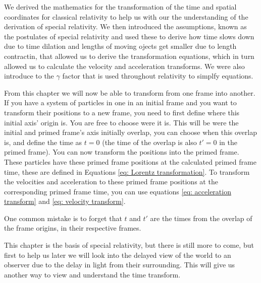 We derived the mathematics for the transformation of the time and spatial coordinates for classical relativity to help us with our the understanding of the derivation of special relativity.
We then introduced the assumptions, known as the postulates of special relativity and used these to derive how time slows down due to time dilation and lengths of moving ojects get smaller due to length contractin, that allowed us to derive the transformation equations, which in turn allowed us to calculate the velocity and acceleration transforms.
We were also introduce to the $\gamma$ factor that is used throughout relativity to simplfy equations.

From this chapter we will now be able to transform from one frame into another.
If you have a system of particles in one in an initial frame and you want to transform their positions to a new frame, you need to first define where this initial axis' origin is.
You are free to choose were it is.
This will be were the initial and primed frame's axis initially overlap, you can choose when this overlap is, and define the time as ${t}=0$ (the time of the overlap is also ${t{'}}=0$ in the primed frame).
You can now transform the positions into the primed frame.
These particles have these primed frame positions at the calculated primed frame time, these are defined in Equations \eqref{eq: Lorentz transformation}.
To transform the velocities and acceleration to these primed frame positions at the corresponding primed frame time, you can use equations \eqref{eq: acceleration transform} and \eqref{eq: velocity transform}.

One common mistake is to forget that ${t}$ and ${t{'}}$ are the times from the overlap of the frame origins, in their respective frames.

This chapter is the basis of special relativity, but there is still more to come, but first to help us later we will look into the delayed view of the world to an observer due to the delay in light from their surrounding.
This will give us another way to view and understand the time transform.



\printbibliography[segment=\therefsegment, heading=subbibliography]

